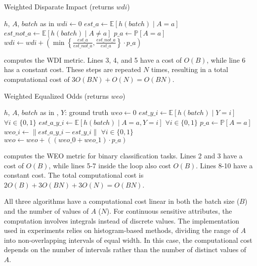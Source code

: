 \begin{algorithm}
    \caption{Weighted Disparate Impact (returns $wdi$)}
    \label{alg:wdi}
    \begin{algorithmic}[1]
        \REQUIRE $h$, $A$, $batch$ \hfill as in 
        \STATE $wdi \leftarrow 0$
            \STATE $est\_a \leftarrow \mathbb{E}[h(batch) \mid A = a]$
            \STATE $est\_not\_a \leftarrow \mathbb{E}[h(batch) \mid A \neq a]$
            \STATE $p\_a \leftarrow \mathbb{P}[A = a]$
            \STATE $wdi \leftarrow wdi + \left( \min\left\{ \frac{est\_a}{est\_not\_a}, \frac{est\_not\_a}{est\_a} \right\} \cdot p\_a \right)$
        \ENDFOR
    \end{algorithmic}
\end{algorithm}

%
 computes the \gls{WDI} metric.
%
Lines 3, 4, and 5 have a cost of \(O(B)\), while line 6 has a constant cost.
%
These steps are repeated \(N\) times, resulting in a total computational cost of \(3O(BN) + O(N) = O(BN)\).

\begin{algorithm}
    \caption{Weighted Equalized Odds (returns $weo$)}
    \label{alg:weo}
    \begin{algorithmic}[1]
        \REQUIRE $h$, $A$, $batch$ \hfill as in , \hfill $Y$: ground truth
        \STATE $weo \leftarrow 0$
        \STATE $est\_y\_i \leftarrow \mathbb{E}[h(batch) \mid Y = i]$ \hfill \(\forall i \in \{0, 1\}\)
            \STATE $est\_a\_y\_i \leftarrow \mathbb{E}[h(batch) \mid A = a, Y = i]$ \hfill \(\forall i \in \{0, 1\}\)
            \STATE $p\_a \leftarrow \mathbb{P}[A = a]$
            \STATE $weo\_i \leftarrow \| est\_a\_y\_i - est\_y\_i \|$ \hfill \(\forall i \in \{0, 1\}\)
            \STATE $weo \leftarrow weo + \left( (weo\_0 + weo\_1) \cdot p\_a \right)$
        \ENDFOR
    \end{algorithmic}
\end{algorithm}

%
 computes the \gls{WEO} metric for binary classification tasks.
%
Lines 2 and 3 have a cost of \(O(B)\), while lines 5-7 inside the loop also cost \(O(B)\).
%
Lines 8-10 have a constant cost.
%
The total computational cost is \(2O(B) + 3O(BN) + 3O(N) = O(BN)\).

%
All three algorithms have a computational cost linear in both the batch size (\(B\)) and the number of values of \(A\) (\(N\)).
%
For continuous sensitive attributes, the computation involves integrals instead of discrete values.
%
The implementation used in experiments relies on histogram-based methods, dividing the range of \(A\) into non-overlapping intervals of equal width.
%
In this case, the computational cost depends on the number of intervals rather than the number of distinct values of \(A\).



